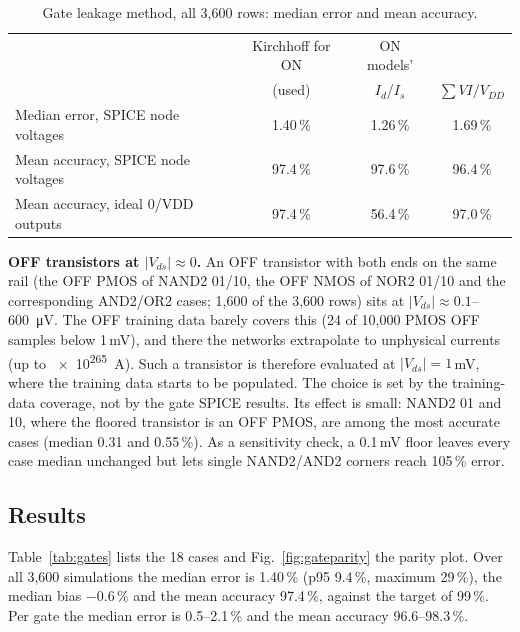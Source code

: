 \documentclass[11pt,a4paper]{article}
\begin{document}
\begin{table}[!htbp]
\centering
\caption{Gate leakage method, all 3{,}600 rows: median error and mean accuracy.}
\label{tab:gatemethods}
\small
\begin{tabular}{lccc}
\toprule
 & Kirchhoff for ON & ON models' & \\
 & (used) & $I_d$/$I_s$ & $\sum V I / V_{DD}$ \\
\midrule
Median error, SPICE node voltages & 1.40\,\% & 1.26\,\% & 1.69\,\% \\
Mean accuracy, SPICE node voltages & 97.4\,\% & 97.6\,\% & 96.4\,\% \\
Mean accuracy, ideal 0/VDD outputs & 97.4\,\% & 56.4\,\% & 97.0\,\% \\
\bottomrule
\end{tabular}
\end{table}

\textbf{OFF transistors at $|V_{ds}| \approx 0$.} An OFF transistor with both ends on the same rail (the
OFF PMOS of NAND2 01/10, the OFF NMOS of NOR2 01/10 and the corresponding AND2/OR2 cases; 1{,}600 of
the 3{,}600 rows) sits at $|V_{ds}| \approx 0.1$--\SI{600}{\micro V}. The OFF training data barely covers
this (24 of 10{,}000 PMOS OFF samples below 1\,mV), and there the networks extrapolate to unphysical
currents (up to \SI{e265}{A}). Such a transistor is therefore evaluated at $|V_{ds}| = 1$\,mV, where the
training data starts to be populated. The choice is set by the training-data coverage, not by the gate
SPICE results. Its effect is small: NAND2 01 and 10, where the floored transistor is an OFF PMOS, are
among the most accurate cases (median 0.31 and 0.55\,\%). As a sensitivity check, a 0.1\,mV floor leaves
every case median unchanged but lets single NAND2/AND2 corners reach 105\,\% error.

\subsection{Results}
Table~\ref{tab:gates} lists the 18 cases and Fig.~\ref{fig:gateparity} the parity plot. Over all 3{,}600
simulations the median error is 1.40\,\% (p95 9.4\,\%, maximum 29\,\%), the median bias $-0.6$\,\% and
the mean accuracy 97.4\,\%, against the target of 99\,\%. Per gate the median error is 0.5--2.1\,\% and
the mean accuracy 96.6--98.3\,\%.
\end{document}
